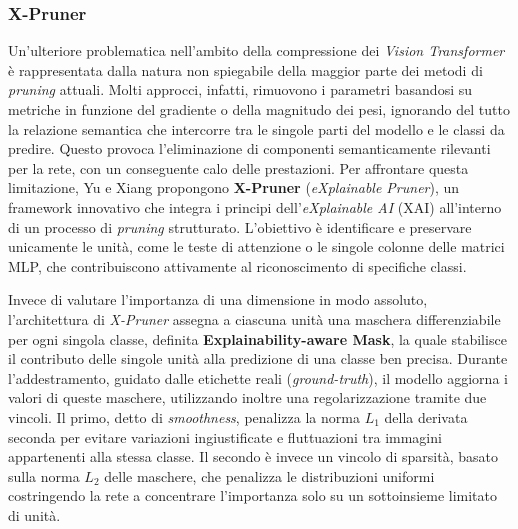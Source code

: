 \subsubsection{X-Pruner}
Un'ulteriore problematica nell'ambito della compressione dei \textit{Vision Transformer} è rappresentata dalla natura non spiegabile della maggior parte dei metodi di \textit{pruning} attuali. Molti approcci, infatti, rimuovono i parametri basandosi su metriche in funzione del gradiente o della magnitudo dei pesi, ignorando del tutto la relazione semantica che intercorre tra le singole parti del modello e le classi da predire. Questo provoca l'eliminazione di componenti semanticamente rilevanti per la rete, con un conseguente calo delle prestazioni. Per affrontare questa limitazione, Yu e Xiang \cite{yu2023xprunerexplainablepruningvision} propongono \textbf{X-Pruner} (\textit{eXplainable Pruner}), un framework innovativo che integra i principi dell'\textit{eXplainable AI} (XAI) all'interno di un processo di \textit{pruning} strutturato. L'obiettivo è identificare e preservare unicamente le unità, come le teste di attenzione o le singole colonne delle matrici MLP, che contribuiscono attivamente al riconoscimento di specifiche classi. \par
Invece di valutare l'importanza di una dimensione in modo assoluto, l'architettura di \textit{X-Pruner} assegna a ciascuna unità una maschera differenziabile per ogni singola classe, definita \textbf{Explainability-aware Mask}, la quale stabilisce il contributo delle singole unità alla predizione di una classe ben precisa. Durante l'addestramento, guidato dalle etichette reali (\textit{ground-truth}), il modello aggiorna i valori di queste maschere, utilizzando inoltre una regolarizzazione tramite due vincoli. Il primo, detto di \textit{smoothness}, penalizza la norma $L_1$ della derivata seconda per evitare variazioni ingiustificate e fluttuazioni tra immagini appartenenti alla stessa classe. Il secondo è invece un vincolo di sparsità, basato sulla norma $L_2$ delle maschere, che penalizza le distribuzioni uniformi costringendo la rete a concentrare l'importanza solo su un sottoinsieme limitato di unità. \par
